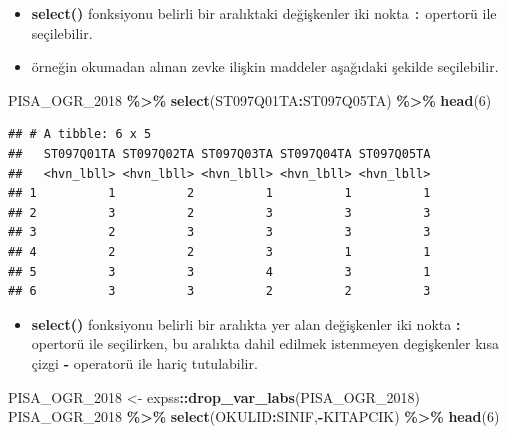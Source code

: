 \documentclass[
  oneside]{book}
\newenvironment{Shaded}{\begin{snugshade}}{\end{snugshade}}
\newcommand{\DecValTok}[1]{\textcolor[rgb]{0.00,0.00,0.81}{#1}}
\newcommand{\FunctionTok}[1]{\textcolor[rgb]{0.13,0.29,0.53}{\textbf{#1}}}
\newcommand{\NormalTok}[1]{#1}
\newcommand{\OtherTok}[1]{\textcolor[rgb]{0.56,0.35,0.01}{#1}}
\newcommand{\SpecialCharTok}[1]{\textcolor[rgb]{0.81,0.36,0.00}{\textbf{#1}}}
\providecommand{\tightlist}{%
  \setlength{\itemsep}{0pt}\setlength{\parskip}{0pt}}
\begin{document}
\begin{itemize}
\item
  \textbf{select()} fonksiyonu belirli bir aralıktaki değişkenler iki nokta \texttt{:} opertorü ile seçilebilir.
\item
  örneğin okumadan alınan zevke ilişkin maddeler aşağıdaki şekilde seçilebilir.
\end{itemize}

\begin{Shaded}
\begin{Highlighting}[]
\NormalTok{PISA\_OGR\_2018 }\SpecialCharTok{\%\textgreater{}\%} \FunctionTok{select}\NormalTok{(ST097Q01TA}\SpecialCharTok{:}\NormalTok{ST097Q05TA) }\SpecialCharTok{\%\textgreater{}\%} \FunctionTok{head}\NormalTok{(}\DecValTok{6}\NormalTok{)}
\end{Highlighting}
\end{Shaded}

\begin{verbatim}
## # A tibble: 6 x 5
##   ST097Q01TA ST097Q02TA ST097Q03TA ST097Q04TA ST097Q05TA
##   <hvn_lbll> <hvn_lbll> <hvn_lbll> <hvn_lbll> <hvn_lbll>
## 1          1          2          1          1          1
## 2          3          2          3          3          3
## 3          2          3          3          3          3
## 4          2          2          3          1          1
## 5          3          3          4          3          1
## 6          3          3          2          2          3
\end{verbatim}

\begin{itemize}
\tightlist
\item
  \textbf{select()} fonksiyonu belirli bir aralıkta yer alan değişkenler iki nokta \textbf{:} opertorü ile seçilirken, bu aralıkta dahil edilmek istenmeyen degişkenler kısa çizgi \textbf{-} operatorü ile hariç tutulabilir.
\end{itemize}

\begin{Shaded}
\begin{Highlighting}[]
\NormalTok{PISA\_OGR\_2018 }\OtherTok{\textless{}{-}}\NormalTok{ expss}\SpecialCharTok{::}\FunctionTok{drop\_var\_labs}\NormalTok{(PISA\_OGR\_2018)}
\NormalTok{PISA\_OGR\_2018 }\SpecialCharTok{\%\textgreater{}\%} \FunctionTok{select}\NormalTok{(OKULID}\SpecialCharTok{:}\NormalTok{SINIF,}\SpecialCharTok{{-}}\NormalTok{KITAPCIK) }\SpecialCharTok{\%\textgreater{}\%} \FunctionTok{head}\NormalTok{(}\DecValTok{6}\NormalTok{)}
\end{Highlighting}
\end{Shaded}
\end{document}
